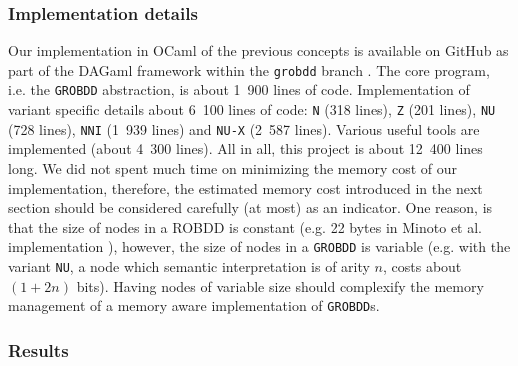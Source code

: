 \documentclass[a4paper,10pt]{article}
\newcommand{\GroBdd}{\texttt{GROBDD}}
\begin{document}
\subsubsection{Implementation details}
Our implementation in OCaml of the previous concepts is available on GitHub as part of the DAGaml framework within the \texttt{grobdd} branch \cite{DAGamlGitHub}.
The core program, i.e. the \GroBdd{} abstraction, is about 1~900 lines of code.
Implementation of variant specific details about 6~100 lines of code: \texttt{N} (318 lines), \texttt{Z} (201 lines), \texttt{NU} (728 lines), \texttt{NNI} (1~939 lines) and \texttt{NU-X} (2~587 lines).
Various useful tools are implemented (about 4~300 lines).
All in all, this project is about 12~400 lines long.
We did not spent much time on minimizing the memory cost of our implementation, therefore, the estimated memory cost introduced in the next section should be considered carefully (at most) as an indicator.
One reason, is that the size of nodes in a ROBDD is constant (e.g. 22 bytes in Minoto et al. implementation \cite{MinatoVariants}), however, the size of nodes in a \GroBdd{} is variable (e.g. with the variant \texttt{NU}, a node which semantic interpretation is of arity $n$, costs about $(1+2n)$ bits).
Having nodes of variable size should complexify the memory management of a memory aware implementation of \GroBdd{}s.

\subsubsection{Results}
\end{document}
